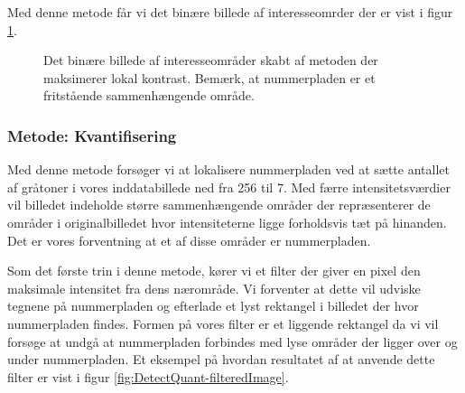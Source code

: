 Med denne metode får vi det binære billede af interesseomrder der er vist i figur \ref{fig:DetectCStretch-binary}.

\begin{figure}[htp]
  \centering
  \caption{Det binære billede af interesseområder skabt af metoden der maksimerer lokal kontrast. Bemærk, at nummerpladen er et fritstående sammenhængende område.}
  \label{fig:DetectCStretch-binary}
\end{figure}

\subsubsection{Metode: Kvantifisering}
Med denne metode forsøger vi at lokalisere nummerpladen ved at sætte antallet af gråtoner i vores inddatabillede ned fra 256 til 7. Med færre intensitetsværdier vil billedet indeholde større sammenhængende områder der repræsenterer de områder i originalbilledet hvor intensiteterne ligge forholdsvis tæt på hinanden. Det er vores forventning at et af disse områder er nummerpladen.

Som det første trin i denne metode, kører vi et filter der giver en pixel den maksimale intensitet fra dens nærområde. Vi forventer at dette vil udviske tegnene på nummerpladen og efterlade et lyst rektangel i billedet der hvor nummerpladen findes. Formen på vores filter er et liggende rektangel da vi vil forsøge at undgå at nummerpladen forbindes med lyse områder der ligger over og under nummerpladen. Et eksempel på hvordan resultatet af at anvende dette filter er vist i figur \vref{fig:DetectQuant-filteredImage}. 

